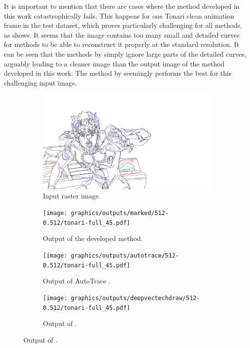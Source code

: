 It is important to mention that there are cases where the method developed in this work catastrophically fails. This happens for one Tonari clean animation frame in the test dataset, which proves particularly challenging for all methods, as  shows. It seems that the image contains too many small and detailed curves for methods to be able to reconstruct it properly at the standard resolution. It can be seen that the methods by \citet{DBLP:conf/eccv/EgiazarianVAVST20,autotrace,Puhachov2021KeypointPolyvector} simply ignore large parts of the detailed curves, arguably leading to a cleaner image than the output image of the method developed in this work. The method by \citet{mo2021virtualsketching} seemingly performs the best for this challenging input image.

\begin{figure}
    \centering
    \begin{subfigure}{.49\textwidth}
    \includegraphics[width=\textwidth]{graphics/outputs/ground-truth/tonari-full_45.png}
    \caption{Input raster image.}
    \end{subfigure}
    \begin{subfigure}{.49\textwidth}
    \texttt{[image: graphics/outputs/marked/512-0.512/tonari-full\_45.pdf]}
    \caption{Output of the developed method.}
    \end{subfigure}
    \begin{subfigure}{.49\textwidth}
    \texttt{[image: graphics/outputs/autotrace/512-0.512/tonari-full\_45.pdf]}
    \caption{Output of AutoTrace \citep{autotrace}.}
    \end{subfigure}
    \begin{subfigure}{.49\textwidth}
    \texttt{[image: graphics/outputs/deepvectechdraw/512-0.512/tonari-full\_45.pdf]}
    \caption{Output of \citet{DBLP:conf/eccv/EgiazarianVAVST20}.}

\end{subfigure}
\end{figure}
